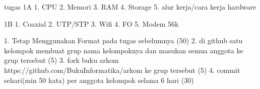 tugas
1A
1. CPU
2. Memori
3. RAM
4. Storage
5. alur kerja/cara kerja hardware


1B 
1. Coaxial
2. UTP/STP
3. Wifi
4. FO
5. Modem 56k

1. Tetap Menggunakan Format pada tugas sebelumnya (50)
2. di github satu kelompok membuat grup nama kelompoknya dan masukan semua anggota ke grup tersebut (5)
3. fork buku arkom https://github.com/BukuInformatika/arkom ke grup tersebut (5)
4. commit sehari(min 50 kata) per anggota kelompok selama 6 hari (30)
